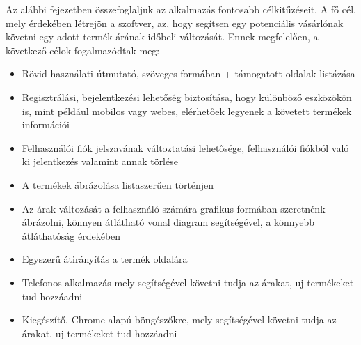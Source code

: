 Az alábbi fejezetben összefoglaljuk az alkalmazás fontosabb célkitűzéseit. A fő cél, mely érdekében létrejön a szoftver, az, hogy segítsen egy potenciális vásárlónak követni egy adott termék árának időbeli változását. Ennek megfelelően, a következő célok fogalmazódtak meg:
\begin{itemize}
    \item Rövid használati útmutató, szöveges formában + támogatott oldalak listázása
    \item Regisztrálási, bejelentkezési lehetőség biztosítása, hogy különböző eszközökön is, mint például mobilos vagy webes, elérhetőek legyenek a követett termékek információi
    \item Felhasználói fiók jelszavának változtatási lehetősége, felhasználói fiókból való ki jelentkezés valamint annak törlése
    \item A termékek ábrázolása listaszerűen történjen
    \item Az árak változását a felhasználó számára grafikus formában szeretnénk ábrázolni, könnyen átlátható vonal diagram segítségével, a könnyebb átláthatóság érdekében 
    \item Egyszerű átirányítás a termék oldalára
    \item Telefonos alkalmazás mely segítségével követni tudja az árakat, uj termékeket tud hozzáadni
	\item Kiegészítő, Chrome alapú böngészőkre, mely segítségével követni tudja az árakat, uj termékeket tud hozzáadni
\end{itemize}